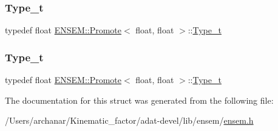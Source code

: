 \mbox{\label{structENSEM_1_1Promote_3_01float_00_01float_01_4_a27610700459f91acb939a75fd84c4d76}} 
\subsubsection{\texorpdfstring{Type\_t}{Type\_t}\hspace{0.1cm}{\footnotesize\ttfamily [2/3]}}
{\footnotesize\ttfamily typedef float \mbox{\hyperlink{structENSEM_1_1Promote}{E\+N\+S\+E\+M\+::\+Promote}}$<$ float, float $>$\+::\mbox{\hyperlink{structENSEM_1_1Promote_3_01float_00_01float_01_4_a27610700459f91acb939a75fd84c4d76}{Type\+\_\+t}}}

\mbox{\label{structENSEM_1_1Promote_3_01float_00_01float_01_4_a27610700459f91acb939a75fd84c4d76}} 
\subsubsection{\texorpdfstring{Type\_t}{Type\_t}\hspace{0.1cm}{\footnotesize\ttfamily [3/3]}}
{\footnotesize\ttfamily typedef float \mbox{\hyperlink{structENSEM_1_1Promote}{E\+N\+S\+E\+M\+::\+Promote}}$<$ float, float $>$\+::\mbox{\hyperlink{structENSEM_1_1Promote_3_01float_00_01float_01_4_a27610700459f91acb939a75fd84c4d76}{Type\+\_\+t}}}



The documentation for this struct was generated from the following file\+:\begin{DoxyCompactItemize}
\item 
/\+Users/archanar/\+Kinematic\+\_\+factor/adat-\/devel/lib/ensem/\mbox{\hyperlink{adat-devel_2lib_2ensem_2ensem_8h}{ensem.\+h}}\end{DoxyCompactItemize}
